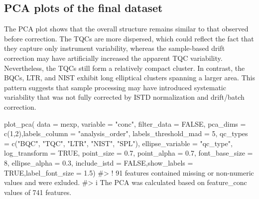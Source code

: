\documentclass[
  letterpaper,
  DIV=11,
  numbers=noendperiod]{scrartcl}
\newenvironment{Shaded}{\begin{snugshade}}{\end{snugshade}}
\newcommand{\AttributeTok}[1]{\textcolor[rgb]{0.40,0.45,0.13}{#1}}
\newcommand{\CommentTok}[1]{\textcolor[rgb]{0.37,0.37,0.37}{#1}}
\newcommand{\ConstantTok}[1]{\textcolor[rgb]{0.56,0.35,0.01}{#1}}
\newcommand{\DecValTok}[1]{\textcolor[rgb]{0.68,0.00,0.00}{#1}}
\newcommand{\FloatTok}[1]{\textcolor[rgb]{0.68,0.00,0.00}{#1}}
\newcommand{\FunctionTok}[1]{\textcolor[rgb]{0.28,0.35,0.67}{#1}}
\newcommand{\NormalTok}[1]{\textcolor[rgb]{0.00,0.23,0.31}{#1}}
\newcommand{\StringTok}[1]{\textcolor[rgb]{0.13,0.47,0.30}{#1}}
\begin{document}
\subsection{PCA plots of the final
dataset}\label{pca-plots-of-the-final-dataset}

The PCA plot shows that the overall structure remains similar to that
observed before correction. The TQCs are more dispersed, which could
reflect the fact that they capture only instrument variability, whereas
the sample-based drift correction may have artificially increased the
apparent TQC variability. Nevertheless, the TQCs still form a relatively
compact cluster. In contrast, the BQCs, LTR, and NIST exhibit long
elliptical clusters spanning a larger area. This pattern suggests that
sample processing may have introduced systematic variability that was
not fully corrected by ISTD normalization and drift/batch correction.

\begin{Shaded}
\begin{Highlighting}[]
\FunctionTok{plot\_pca}\NormalTok{(}
  \AttributeTok{data =}\NormalTok{ mexp,}
  \AttributeTok{variable =} \StringTok{"conc"}\NormalTok{,}
  \AttributeTok{filter\_data =} \ConstantTok{FALSE}\NormalTok{,}
  \AttributeTok{pca\_dims =} \FunctionTok{c}\NormalTok{(}\DecValTok{1}\NormalTok{,}\DecValTok{2}\NormalTok{),}\AttributeTok{labels\_column =} \StringTok{"analysis\_order"}\NormalTok{,}
  \AttributeTok{labels\_threshold\_mad =} \DecValTok{5}\NormalTok{,}
  \AttributeTok{qc\_types =} \FunctionTok{c}\NormalTok{(}\StringTok{"BQC"}\NormalTok{, }\StringTok{"TQC"}\NormalTok{, }\StringTok{"LTR"}\NormalTok{, }\StringTok{"NIST"}\NormalTok{, }\StringTok{"SPL"}\NormalTok{),}
  \AttributeTok{ellipse\_variable =} \StringTok{"qc\_type"}\NormalTok{,}
  \AttributeTok{log\_transform =} \ConstantTok{TRUE}\NormalTok{,}
  \AttributeTok{point\_size =} \FloatTok{0.7}\NormalTok{, }\AttributeTok{point\_alpha =} \FloatTok{0.7}\NormalTok{, }\AttributeTok{font\_base\_size =} \DecValTok{8}\NormalTok{, }\AttributeTok{ellipse\_alpha =} \FloatTok{0.3}\NormalTok{,}
  \AttributeTok{include\_istd =} \ConstantTok{FALSE}\NormalTok{,}\AttributeTok{show\_labels =} \ConstantTok{TRUE}\NormalTok{,}\AttributeTok{label\_font\_size =} \FloatTok{1.5}\NormalTok{) }
\CommentTok{\#\textgreater{} ! 91 features contained missing or non{-}numeric values and were exluded.}
\CommentTok{\#\textgreater{} i The PCA was calculated based on \textasciigrave{}feature\_conc\textasciigrave{} values of 741 features.}
\end{Highlighting}
\end{Shaded}
\end{document}
